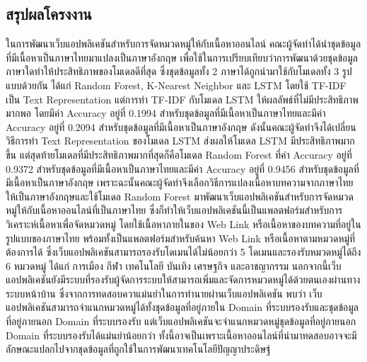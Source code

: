 \documentclass[12pt,oneside,openright,a4paper]{cpe-thai-project}
\begin{document}
\begin{itemize}
\begin{enumerate}
\section{สรุปผลโครงงาน}
\hspace{1cm}ในการพัฒนาเว็บแอปพลิเคชันสำหรับการจัดหมวดหมู่ให้กับเนื้อหาออนไลน์ คณะผู้จัดทำได้นำชุดข้อมูลที่มีเนื้อหาเป็นภาษาไทยมาแปลงเป็นภาษาอังกฤษ
เพื่อใช้ในการเปรียบเทียบว่าการพัฒนาด้วยชุดข้อมูลภาษาใดทำให้ประสิทธิภาพของโมเดลดีที่สุด ซึ่งชุดข้อมูลทั้ง 2 ภาษาได้ถูกนำมาใช้กับโมเดลทั้ง 3 รูปแบบด้วยกัน ได้แก่
Random Forest, K-Nearest Neighbor และ LSTM โดยใช้ TF-IDF เป็น Text Representation แต่การทำ TF-IDF กับโมเดล LSTM ให้ผลลัพธ์ที่ไม่มีประสิทธิภาพมากพอ
โดยมีค่า Accuracy อยู่ที่ 0.1994 สำหรับชุดข้อมูลที่มีเนื้อหาเป็นภาษาไทยและมีค่า Accuracy อยู่ที่ 0.2094 สำหรับชุดข้อมูลที่มีเนื้อหาเป็นภาษาอังกฤษ 
ดังนั้นคณะผู้จัดทำจึงได้เปลี่ยนวิธีการทำ Text Representation ของโมเดล LSTM ส่งผลให้โมเดล LSTM มีประสิทธิภาพมากขึ้น แต่สุดท้ายโมเดลที่มีประสิทธิภาพมากที่สุดก็คือโมเดล
Random Forest ที่ค่า Accuracy อยู่ที่ 0.9372 สำหรับชุดข้อมูลที่มีเนื้อหาเป็นภาษาไทยและมีค่า Accuracy อยู่ที่ 0.9456 สำหรับชุดข้อมูลที่มีเนื้อหาเป็นภาษาอังกฤษ
เพราะฉะนั้นคณะผู้จัดทำจึงเลือกวิธีการแปลงเนื้อหาบทความจากภาษาไทยให้เป็นภาษาอังกฤษและใช้โมเดล Random Forest 
มาพัฒนาเว็บแอปพลิเคชันสําหรับการจัดหมวดหมู่ให้กับเนื้อหาออนไลน์ที่เป็นภาษาไทย ซึ่งก็ทำให้เว็บแอปพลิเคชันนี้เป็นแพลตฟอร์มสําหรับการวิเคราะห์เนื้อหาเพื่อจัดหมวดหมู่ 
โดยใช้เนื้อหาภายในของ Web Link หรือเนื้อหาของบทความที่อยู่ในรูปแบบของภาษาไทย พร้อมทั้งเป็นแพลตฟอร์มสําหรับค้นหา Web Link หรือเนื้อหาตามหมวดหมู่ที่ต้องการได้
ซึ่งเว็บแอปพลิเคชันสามารถรองรับโดเมนได้ไม่น้อยกว่า 5 โดเมนและรองรับหมวดหมู่ได้ถึง 6 หมวดหมู่ ได้แก่ การเมือง กีฬา เทคโนโลยี บันเทิง เศรษฐกิจ และอาชญากรรม
นอกจากนี้เว็บแอปพลิเคชันยังมีระบบที่รองรับผู้จัดการระบบให้สามารถเพิ่มและจัดการหมวดหมู่ได้ด้วยตนเองผ่านทางระบบหน้าบ้าน ซึ่งจากการทดสอบควาแม่นยำในการทำนายผ่านเว็บแอปพลิเคชัน
พบว่า เว็บแอปพลิเคชันสามารถจำแนกหมวดหมู่ได้ทั้งชุดข้อมูลที่อยู่ภายใน Domain ที่ระบบรองรับและชุดข้อมูลที่อยู่ภายนอก Domain ที่ระบบรองรับ 
แต่เว็บแอปพลิเคชันจะจำแนกหมวดหมู่ชุดข้อมูลที่อยู่ภายนอก Domain ที่ระบบรองรับได้แม่นยำน้อยกว่า 
ทั้งนี้อาจเป็นเพราะเนื้อหาออนไลน์ที่นำมาทดสอบอาจจะมีลักษณะแปลกไปจากชุดข้อมูลที่ถูกใช้ในการพัฒนาเทคโนโลยีปัญญาประดิษฐ์


\end{enumerate}
\end{itemize}
\end{document}
